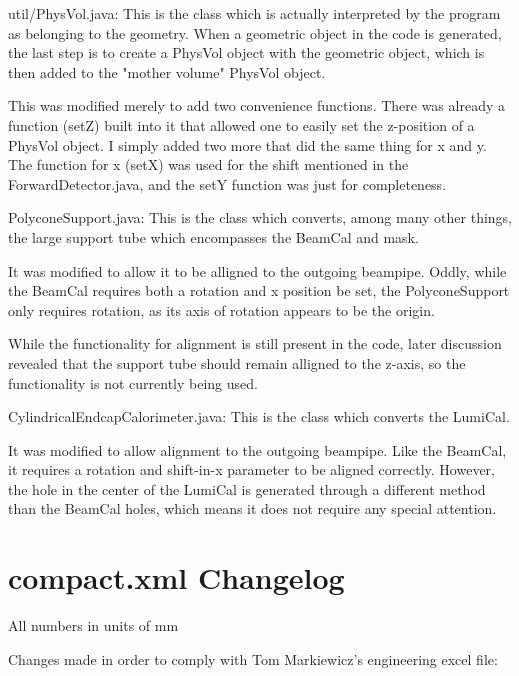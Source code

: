 \documentclass{report}
\begin{document}
        util/PhysVol.java:
            This is the class which is actually interpreted by the program as
            belonging to the geometry. When a geometric object in the code is generated, the
            last step is to create a PhysVol object with the geometric object, which
            is then added to the "mother volume" PhysVol object.

            This was modified merely to add two convenience functions. There was
            already a function (setZ) built into it that allowed one to easily set the
            z-position of a PhysVol object. I simply added two more that did the same
            thing for x and y. The function for x (setX) was used for the shift
            mentioned in the ForwardDetector.java, and the setY function was just for
            completeness.


        PolyconeSupport.java:
            This is the class which converts, among many other things, the large
            support tube which encompasses the BeamCal and mask.

            It was modified to allow it to be alligned to the outgoing beampipe.
            Oddly, while the BeamCal requires both a rotation and x position be set,
            the PolyconeSupport only requires rotation, as its axis of rotation
            appears to be the origin.

            While the functionality for alignment is still present in the code, later discussion
            revealed that the support tube should remain alligned to the z-axis, so
            the functionality is not currently being used.


        CylindricalEndcapCalorimeter.java:
            This is the class which converts the LumiCal.

            It was modified to allow alignment to the outgoing beampipe. Like the
            BeamCal, it requires a rotation and shift-in-x parameter to be aligned
            correctly. However, the hole in the center of the LumiCal is generated
            through a different method than the BeamCal holes, which means it does not
            require any special attention.


    \section{compact.xml Changelog} \label{compact_changes}
        All numbers in units of mm


        Changes made in order to comply with Tom Markiewicz's engineering excel file:
\end{document}
